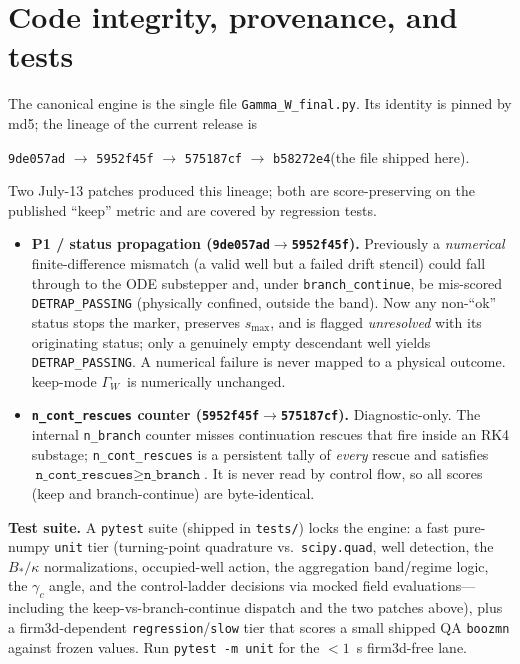 \documentclass[11pt]{article}
\newcommand{\code}[1]{\texttt{#1}}
\newcommand{\GW}{\ensuremath{\Gamma_W}}
\newcommand{\Bstar}{\ensuremath{B_\ast}}
\begin{document}
\section{Code integrity, provenance, and tests}
\label{sec:integrity}

The canonical engine is the single file \code{Gamma\_W\_final.py}. Its identity is pinned by md5;
the lineage of the current release is
\begin{center}\small
\code{9de057ad} $\to$ \code{5952f45f} $\to$ \code{575187cf} $\to$ \code{b58272e4}\quad(the file shipped here).
\end{center}
Two July-13 patches produced this lineage; both are score-preserving on the published ``keep''
metric and are covered by regression tests.
\begin{itemize}[nosep]
  \item \textbf{P1 / status propagation (\code{9de057ad}$\to$\code{5952f45f}).} Previously a
        \emph{numerical} finite-difference mismatch (a valid well but a failed drift stencil) could
        fall through to the ODE substepper and, under \code{branch\_continue}, be mis-scored
        \code{DETRAP\_PASSING} (physically confined, outside the band). Now any non-``ok'' status
        stops the marker, preserves $s_{\max}$, and is flagged \emph{unresolved} with its
        originating status; only a genuinely empty descendant well yields \code{DETRAP\_PASSING}.
        A numerical failure is never mapped to a physical outcome. keep-mode \GW\ is numerically
        unchanged.
  \item \textbf{\code{n\_cont\_rescues} counter (\code{5952f45f}$\to$\code{575187cf}).}
        Diagnostic-only. The internal \code{n\_branch} counter misses continuation rescues that
        fire inside an RK4 substage; \code{n\_cont\_rescues} is a persistent tally of \emph{every}
        rescue and satisfies $\code{n\_cont\_rescues}\ge\code{n\_branch}$. It is never read by
        control flow, so all scores (keep and branch-continue) are byte-identical.
\end{itemize}

\textbf{Test suite.} A \code{pytest} suite (shipped in \code{tests/}) locks the engine: a fast
pure-numpy \code{unit} tier (turning-point quadrature vs.\ \code{scipy.quad}, well detection, the
$\Bstar/\kappa$ normalizations, occupied-well action, the aggregation band/regime logic, the
$\gamma_c$ angle, and the control-ladder decisions via mocked field evaluations---including the
keep-vs-branch-continue dispatch and the two patches above), plus a firm3d-dependent
\code{regression}/\code{slow} tier that scores a small shipped QA \code{boozmn} against frozen
values. Run \code{pytest -m unit} for the $<1$~s firm3d-free lane.
\end{document}
